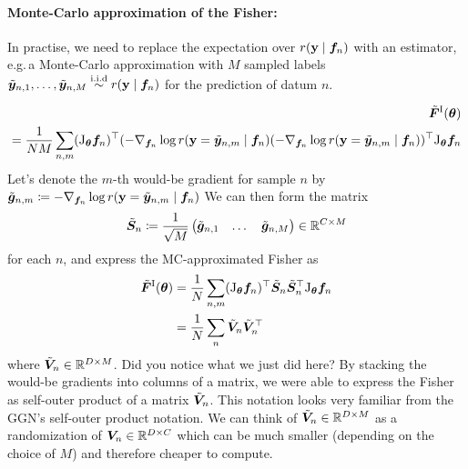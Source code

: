 \paragraph{Monte-Carlo approximation of the Fisher:} In practise, we need to replace the expectation over $r({\mathbf{y}} \mid {\bm{f}}_n)$ with an estimator, e.g.\,a Monte-Carlo approximation with $M$ sampled labels $\tilde{{\bm{y}}}_{n,1}, \dots, \tilde{{\bm{y}}}_{n, M} \stackrel{\text{i.i.d}}{\sim} r({\mathbf{y}} \mid {\bm{f}}_n)$ for the prediction of datum $n$.

\begin{align*}
  \tilde{{\bm{F}}}^{\text{I}}({\bm{\theta}})
  \\
   =
    \frac{1}{NM} \sum_{n,m}
    (\mathrm{J}_{{\bm{\theta}}}{\bm{f}}_n)^{\top}
      (-\nabla_{{\bm{f}}_n} \log r({\mathbf{y}} = \tilde{{\bm{y}}}_{n,m} \mid {\bm{f}}_n) (-\nabla_{{\bm{f}}_n} \log r({\mathbf{y}} = \tilde{{\bm{y}}}_{n,m} \mid {\bm{f}}_n))^{\top}
    \mathrm{J}_{{\bm{\theta}}}{\bm{f}}_n
\end{align*}
Let's denote the $m$-th would-be gradient for sample $n$ by $\tilde{{\bm{g}}}_{n,m} \coloneq -\nabla_{{\bm{f}}_n} \log r({\mathbf{y}} = \tilde{{\bm{y}}}_{n,m} \mid {\bm{f}}_n)$
We can then form the matrix
\begin{align*}
  \tilde{{\bm{S}}}_n
  \coloneq
  \frac{1}{\sqrt{M}}
  \begin{pmatrix}
    \tilde{{\bm{g}}}_{n,1} & \dots & \tilde{{\bm{g}}}_{n,M}
  \end{pmatrix}
  \in {\mathbb{R}}^{C \times M}
\end{align*}
for each $n$, and express the MC-approximated Fisher as
\begin{align*}
  \tilde{{\bm{F}}}^{\text{I}}({\bm{\theta}})
  &=
    \frac{1}{N} \sum_{n,m}
    (\mathrm{J}_{{\bm{\theta}}}{\bm{f}}_n)^{\top}
    \tilde{{\bm{S}}}_n
    \tilde{{\bm{S}}}_n^{\top}
    \mathrm{J}_{{\bm{\theta}}}{\bm{f}}_n
  \\
  &=
    \frac{1}{N} \sum_n
    \tilde{{\bm{V}}}_n
    \tilde{{\bm{V}}}_n^{\top}
\end{align*}
where $\tilde{{\bm{V}}}_n \in {\mathbb{R}}^{D \times M}$.
Did you notice what we just did here?
By stacking the would-be gradients into columns of a matrix, we were able to express the Fisher as self-outer product of a matrix $\tilde{{\bm{V}}}_n$.
This notation looks very familiar from the GGN's self-outer product notation.
We can think of $\tilde{{\bm{V}}}_n \in {\mathbb{R}}^{D \times M}$ as a randomization of ${\bm{V}}_n \in {\mathbb{R}}^{D \times C}$ which can be much smaller (depending on the choice of $M$) and therefore cheaper to compute.

